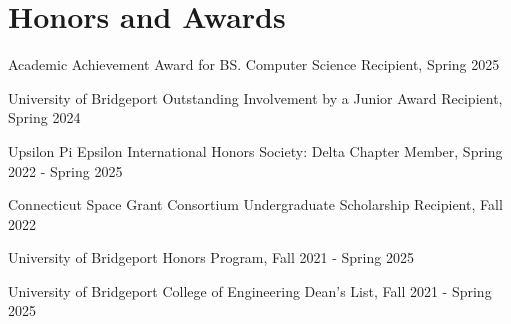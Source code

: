 \section{Honors and Awards}      
    \begin{onecolentry}
        \item Academic Achievement Award for BS. Computer Science Recipient, Spring 2025
        \item University of Bridgeport Outstanding Involvement by a Junior Award Recipient, Spring 2024
        \item Upsilon Pi Epsilon International Honors Society: Delta Chapter Member, Spring 2022 - Spring 2025
        \item Connecticut Space Grant Consortium Undergraduate Scholarship Recipient, Fall 2022
        \item University of Bridgeport Honors Program, Fall 2021 - Spring 2025
        \item University of Bridgeport College of Engineering Dean's List, Fall 2021 - Spring 2025
    \end{onecolentry}